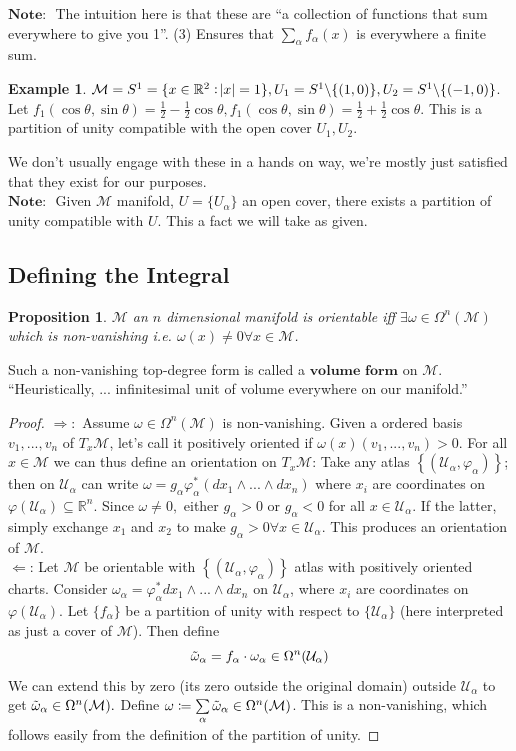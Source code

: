 \documentclass[10pt]{article}
\theoremstyle{plain}
\newtheorem{prop}[thm]{Proposition}
\theoremstyle{definition}
\newtheorem{exmp}[thm]{Example} %
\newcommand{\Note}{\textbf{Note: }}
\newcommand{\Real}{\mathbb{R}}
\newcommand{\man}{\mathcal{M}}
\newcommand{\chartU}{\mathcal{U}}
\newcommand{\chart}{\varphi}
\newcommand{\alphaatlas}{\left\{(\chartU_\alpha,\chart_\alpha)\right\}}
\newcommand{\xman}{x\in\man}
\newcommand{\allthevs}[2]{v_{#1},...,v_{#2}}
\newcommand{\allthewedge}[3]{{#1}_{#2}\wedge...\wedge{#1}_{#3}}
\newcommand{\tang}{T_x\man}
\newcommand{\pformman}[1]{\Omega^{#1}(\man)}
\newcommand{\dx}{dx}
\newcommand{\sumfromto}[2]{\sum\limits_{#1}^{#2}}
\newcommand{\mysubsection}[1]{
    \subsection{#1}
}
\begin{document}
  $\Note $ The intuition here is that these are ``a collection of functions that sum everywhere to give you 1''. (3) Ensures that $\sumfromto{\alpha}{}f_\alpha(x)$ is everywhere a finite sum.
  \begin{exmp}
  $\man = S^1 = \{x\in\Real^2 : \abs{x} = 1 \}, U_1 = S^1\backslash\{(1,0)\}, U_2 = S^1\backslash\{(-1,0)\}$. Let $f_1(\cos\theta,\sin\theta) = \frac{1}{2} - \frac{1}{2} \cos \theta, f_1(\cos\theta,\sin\theta) = \frac{1}{2} + \frac{1}{2} \cos \theta$. This is a partition of unity compatible with the open cover $U_1,U_2.$
  \end{exmp}\noindent
  We don't usually engage with these in a hands on way, we're mostly just satisfied that they exist for our purposes.\\
  $\Note$ Given $\man$ manifold, $U = \{U_\alpha\}$ an open cover, there exists a partition of unity compatible with $U$. This a fact we will take as given.
\mysubsection{Defining the Integral}
\begin{prop}
$\man$ an $n$ dimensional manifold is orientable iff $\exists \omega \in\pformman{n}$ which is non-vanishing i.e. $\omega(x) \neq 0 \forall \xman$. 
\end{prop}\noindent
Such a non-vanishing top-degree form is called a $\textbf{volume form}$ on $\man$. ``Heuristically, ... infinitesimal unit of volume everywhere on our manifold.''
\begin{proof}
$\Rightarrow:$ Assume $\omega\in\pformman{n}$ is non-vanishing. Given a ordered basis $\allthevs{1}{n}$ of $\tang$, let's call it positively oriented if $\omega(x)(\allthevs{1}{n})>0.$ For all $\xman$ we can thus define an orientation on $\tang$: Take any atlas $\alphaatlas$; then on $\chartU_\alpha$ can write $\omega = g_\alpha \chart^*_\alpha ( \allthewedge{\dx}{1}{n})$ where $x_i$ are coordinates on $\chart(\chartU_\alpha)\subseteq \Real^n.$ Since $\omega \neq 0,$ either $g_\alpha > 0$ or $g_\alpha <0$ for all $x \in \chartU _\alpha$. If the latter, simply exchange $x_1$ and $x_2$ to make $g_\alpha>0 \forall x\in\chartU_\alpha$. This produces an orientation of $\man$.\\
$\Leftarrow$: Let $\man$ be orientable with $\alphaatlas$ atlas with positively oriented charts. Consider $\omega_\alpha = \chart^*_\alpha \allthewedge{\dx}{1}{n}$ on $\chartU_\alpha$, where $x_i$ are coordinates on $\chart(\chartU_\alpha).$ Let $\{f_\alpha\}$ be a partition of unity with respect to $\{\chartU_\alpha\}$ (here interpreted as just a cover of $\man$). Then define $$\Tilde{\omega}_\alpha = f_\alpha \cdot \omega_\alpha \in \Omega^n(\chartU_\alpha)$$ We can extend this by zero (its zero outside the original domain) outside $\chartU_\alpha$ to get $\Tilde{\omega}_\alpha \in \pformman{n}.$ Define $\omega \coloneqq \sumfromto{\alpha}{} \Tilde{\omega}_\alpha\in\pformman{n}$. This is a non-vanishing, which follows easily from the definition of the partition of unity.
\end{proof}\noindent
\end{document}
